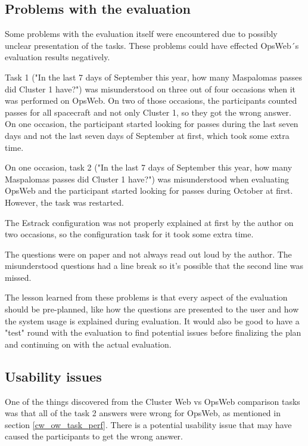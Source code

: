 \subsection{Problems with the evaluation} \label{evaluation_problems}
Some problems with the evaluation itself were encountered due to possibly unclear presentation of the tasks. These problems could have effected OpsWeb´s evaluation results negatively.

Task 1 ("In the last 7 days of September this year, how many Maspalomas passes did Cluster 1 have?") was misunderstood on three out of four occasions when it was performed on OpsWeb. On two of those occasions, the participants counted passes for all spacecraft and not only Cluster 1, so they got the wrong answer. On one occasion, the participant started looking for passes during the last seven days and not the last seven days of September at first, which took some extra time.

On one occasion, task 2 ("In the last 7 days of September this year, how many Maspalomas passes did Cluster 1 have?") was misunderstood when evaluating OpsWeb and the participant started looking for passes during October at first. However, the task was restarted.

The Estrack configuration was not properly explained at first by the author on two occasions, so the configuration task for it took some extra time.

The questions were on paper and not always read out loud by the author. The misunderstood questions had a line break so it's possible that the second line was missed. 

The lesson learned from these problems is that every aspect of the evaluation should be pre-planned, like how the questions are presented to the user and how the system usage is explained during evaluation. It would also be good to have a "test" round with the evaluation to find potential issues before finalizing the plan and continuing on with the actual evaluation.

\subsection{Usability issues} \label{usability_issues}
One of the things discovered from the Cluster Web vs OpsWeb comparison tasks was that all of the task 2 answers were wrong for OpsWeb, as mentioned in section \ref{cw_ow_task_perf}. There is a potential usability issue that may have caused the participants to get the wrong answer.

